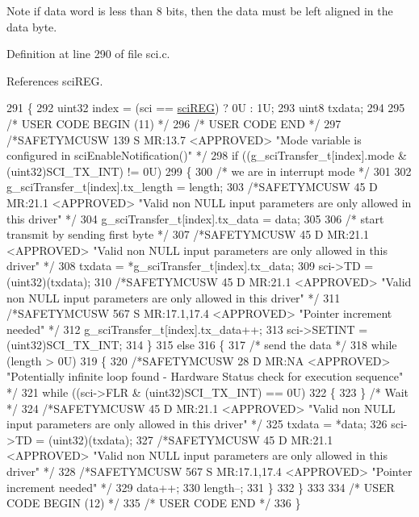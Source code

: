 \begin{DoxyNote}{Note}
if data word is less than 8 bits, then the data must be left aligned in the data byte. 
\end{DoxyNote}


Definition at line 290 of file sci.\+c.



References sci\+R\+EG.


\begin{DoxyCode}
291 \{
292     uint32 index = (sci == \mbox{\hyperlink{reg__sci_8h_acdc43faa5b34a7b497da4941e225e3ad}{sciREG}}) ? 0U : 1U;
293     uint8 txdata;
294     
295 \textcolor{comment}{/* USER CODE BEGIN (11) */}
296 \textcolor{comment}{/* USER CODE END */}
297 \textcolor{comment}{/*SAFETYMCUSW 139 S MR:13.7 <APPROVED> "Mode variable is configured in sciEnableNotification()" */}
298     \textcolor{keywordflow}{if} ((g\_sciTransfer\_t[index].mode & (uint32)SCI\_TX\_INT) != 0U)
299     \{
300         \textcolor{comment}{/* we are in interrupt mode */}
301         
302         g\_sciTransfer\_t[index].tx\_length = length;
303         \textcolor{comment}{/*SAFETYMCUSW 45 D MR:21.1 <APPROVED> "Valid non NULL input parameters are only allowed in this
       driver" */}
304         g\_sciTransfer\_t[index].tx\_data   = data;
305 
306         \textcolor{comment}{/* start transmit by sending first byte */}        
307         \textcolor{comment}{/*SAFETYMCUSW 45 D MR:21.1 <APPROVED> "Valid non NULL input parameters are only allowed in this
       driver" */}
308         txdata = *g\_sciTransfer\_t[index].tx\_data;
309         sci->TD     = (uint32)(txdata);
310         \textcolor{comment}{/*SAFETYMCUSW 45 D MR:21.1 <APPROVED> "Valid non NULL input parameters are only allowed in this
       driver" */}
311         \textcolor{comment}{/*SAFETYMCUSW 567 S MR:17.1,17.4 <APPROVED> "Pointer increment needed" */}
312         g\_sciTransfer\_t[index].tx\_data++;
313         sci->SETINT = (uint32)SCI\_TX\_INT;
314     \}
315     \textcolor{keywordflow}{else}
316     \{
317         \textcolor{comment}{/* send the data */}
318         \textcolor{keywordflow}{while} (length > 0U)
319         \{
320             \textcolor{comment}{/*SAFETYMCUSW 28 D MR:NA <APPROVED> "Potentially infinite loop found - Hardware Status check
       for execution sequence" */}
321             \textcolor{keywordflow}{while} ((sci->FLR & (uint32)SCI\_TX\_INT) == 0U)
322             \{ 
323             \} \textcolor{comment}{/* Wait */}
324             \textcolor{comment}{/*SAFETYMCUSW 45 D MR:21.1 <APPROVED> "Valid non NULL input parameters are only allowed in this
       driver" */}
325             txdata = *data;
326             sci->TD = (uint32)(txdata);
327             \textcolor{comment}{/*SAFETYMCUSW 45 D MR:21.1 <APPROVED> "Valid non NULL input parameters are only allowed in this
       driver" */}
328             \textcolor{comment}{/*SAFETYMCUSW 567 S MR:17.1,17.4 <APPROVED> "Pointer increment needed" */}
329             data++;
330             length--;
331         \}
332     \}
333 
334 \textcolor{comment}{/* USER CODE BEGIN (12) */}
335 \textcolor{comment}{/* USER CODE END */}
336 \}
\end{DoxyCode}
